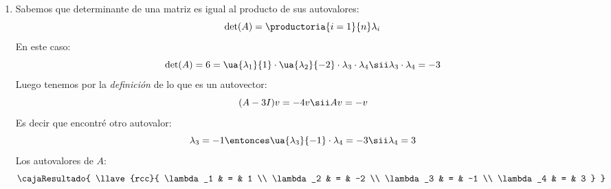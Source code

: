 \begin{enumerate}[label=(\alph*)]
  \item Sabemos que determinante de una matriz es igual al producto de sus autovalores:
        $$
          \det(A) = \productoria{i = 1}{n} \lambda_i
        $$
        En este caso:
        $$
          \det(A) = 6 =
          \ua{\lambda_1}{1} \cdot
          \ua{\lambda_2}{-2} \cdot
          \lambda_3 \cdot
          \lambda_4
          \sii
          \lambda_3 \cdot
          \lambda_4
          = -3
        $$
        Luego tenemos por la \textit{definición} de lo que es un autovector:
        $$
          (A - 3I)v = -4v \sii Av = -v
        $$
        Es decir que encontré otro autovalor:
        $$
          \lambda_3 = -1
          \entonces
          \ua{\lambda_3}{-1} \cdot
          \lambda_4
          = -3
          \sii
          \lambda_4
          = 3
        $$
        Los autovalores de $A$:
        $$
          \cajaResultado{
            \llave{rcc}{
              \lambda_1 & = & 1 \\
              \lambda_2 & = & -2 \\
              \lambda_3 & = & -1 \\
              \lambda_4 & = & 3
            }
          }
        $$
\end{enumerate}

\begin{aportes}
  \item {}
\end{aportes}
